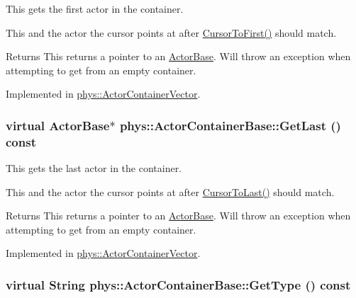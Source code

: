 This gets the first actor in the container. 

This and the actor the cursor points at after \hyperlink{classphys_1_1ActorContainerBase_ab1a44758d7c17e70ff2e0f8de47424c3}{CursorToFirst()} should match. \begin{DoxyReturn}{Returns}
This returns a pointer to an \hyperlink{classphys_1_1ActorBase}{ActorBase}. Will throw an exception when attempting to get from an empty container. 
\end{DoxyReturn}


Implemented in \hyperlink{classphys_1_1ActorContainerVector_a55ceecd017455f3185aa62798811e3c6}{phys::ActorContainerVector}.

\hypertarget{classphys_1_1ActorContainerBase_a8efeffd5ae22085fe01af791b3ea559e}{
\subsubsection[{GetLast}]{\setlength{\rightskip}{0pt plus 5cm}virtual {\bf ActorBase}$\ast$ phys::ActorContainerBase::GetLast () const}}
\label{d1/d00/classphys_1_1ActorContainerBase_a8efeffd5ae22085fe01af791b3ea559e}


This gets the last actor in the container. 

This and the actor the cursor points at after \hyperlink{classphys_1_1ActorContainerBase_afad072e018a04c190e5e5fb93b82b354}{CursorToLast()} should match. \begin{DoxyReturn}{Returns}
This returns a pointer to an \hyperlink{classphys_1_1ActorBase}{ActorBase}. Will throw an exception when attempting to get from an empty container. 
\end{DoxyReturn}


Implemented in \hyperlink{classphys_1_1ActorContainerVector_a211f6e419ef0b753cecf2c662a54511e}{phys::ActorContainerVector}.

\hypertarget{classphys_1_1ActorContainerBase_a526dab176597858680490d128d0584a3}{
\subsubsection[{GetType}]{\setlength{\rightskip}{0pt plus 5cm}virtual {\bf String} phys::ActorContainerBase::GetType () const}}
\label{d1/d00/classphys_1_1ActorContainerBase_a526dab176597858680490d128d0584a3}


